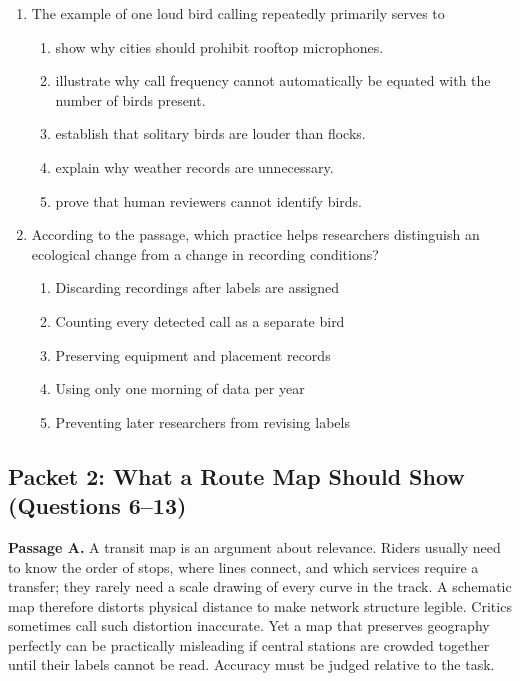 \begin{enumerate}
\item The example of one loud bird calling repeatedly primarily serves to
  \begin{enumerate}
  \item show why cities should prohibit rooftop microphones.
  \item illustrate why call frequency cannot automatically be equated with the
        number of birds present.
  \item establish that solitary birds are louder than flocks.
  \item explain why weather records are unnecessary.
  \item prove that human reviewers cannot identify birds.
  \end{enumerate}

\item According to the passage, which practice helps researchers distinguish an
ecological change from a change in recording conditions?
  \begin{enumerate}
  \item Discarding recordings after labels are assigned
  \item Counting every detected call as a separate bird
  \item Preserving equipment and placement records
  \item Using only one morning of data per year
  \item Preventing later researchers from revising labels
  \end{enumerate}
\end{enumerate}

\subsection*{Packet 2: What a Route Map Should Show (Questions 6--13)}

\textbf{Passage A.} A transit map is an argument about relevance. Riders usually
need to know the order of stops, where lines connect, and which services require
a transfer; they rarely need a scale drawing of every curve in the track. A
schematic map therefore distorts physical distance to make network structure
legible. Critics sometimes call such distortion inaccurate. Yet a map that
preserves geography perfectly can be practically misleading if central stations
are crowded together until their labels cannot be read. Accuracy must be judged
relative to the task.

